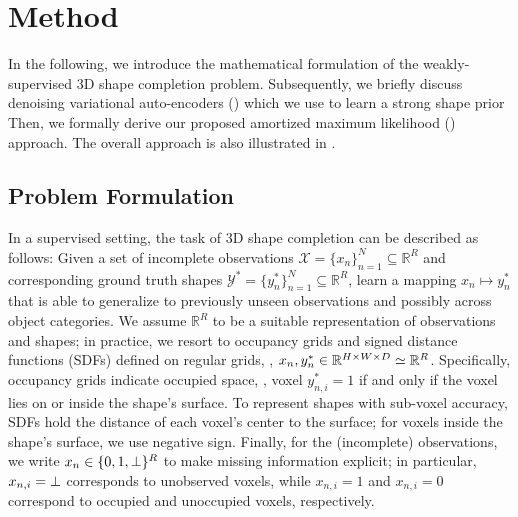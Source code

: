 \section{Method}
\label{sec:method}

In the following, we introduce the mathematical formulation of the weakly-supervised 3D shape completion problem. Subsequently, we briefly discuss denoising variational auto-encoders (\DVAEs) \citep{Kingma2014ICLR,Im2017AAAI} which we use to learn a strong shape prior  Then, we formally derive our proposed amortized maximum likelihood (\AML) approach.  The overall approach is also illustrated in .

\subsection{Problem Formulation}
\label{subsec:method-problem}



In a supervised setting, the task of 3D shape completion can be described as follows: Given a set of incomplete observations $\mathcal{X} = \{x_n\}_{n = 1}^N \subseteq \mathbb{R}^R$ and corresponding ground truth shapes $\mathcal{Y}^* = \{y_n^*\}_{n = 1}^N \subseteq \mathbb{R}^R$, learn a mapping $x_n \mapsto y_n^*$ that is able to generalize to previously unseen observations and possibly across object categories. We assume $\mathbb{R}^R$ to be a suitable representation of observations and shapes; in practice, we resort to occupancy grids and signed distance functions (SDFs) defined on regular grids, \ie, $x_n, y_n^* \in \mathbb{R}^{H \operatorname*{\!\times\!} W \operatorname*{\!\times\!} D} \simeq \mathbb{R}^R$. Specifically, occupancy grids indicate occupied space, \ie, voxel $y_{n,i}^* = 1$ if and only if the voxel lies on or inside the shape's surface. To represent shapes with sub-voxel accuracy, SDFs hold the distance of each voxel's center to the surface; for voxels inside the shape's surface, we use negative sign.
Finally, for the (incomplete) observations, we write $x_n \in \{0, 1, \bot\}^R$ to make missing information explicit; in particular, $x_{n,i} = \bot$ corresponds to unobserved voxels, while $x_{n,i} = 1$ and $x_{n,i} = 0$ correspond to occupied and unoccupied voxels, respectively.


